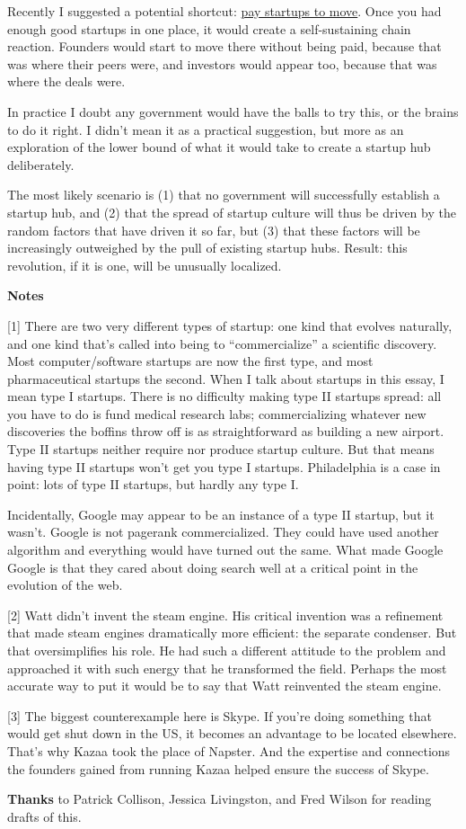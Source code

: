 Recently I suggested a potential shortcut: \href{maybe.html}{pay
startups to move}. Once you had enough good startups in one place, it
would create a self-sustaining chain reaction. Founders would start to
move there without being paid, because that was where their peers were,
and investors would appear too, because that was where the deals were.

In practice I doubt any government would have the balls to try this, or
the brains to do it right. I didn't mean it as a practical suggestion,
but more as an exploration of the lower bound of what it would take to
create a startup hub deliberately.

The most likely scenario is (1) that no government will successfully
establish a startup hub, and (2) that the spread of startup culture will
thus be driven by the random factors that have driven it so far, but (3)
that these factors will be increasingly outweighed by the pull of
existing startup hubs. Result: this revolution, if it is one, will be
unusually localized.

\textbf{Notes}

{[}1{]} There are two very different types of startup: one kind that
evolves naturally, and one kind that's called into being to
``commercialize'' a scientific discovery. Most computer/software
startups are now the first type, and most pharmaceutical startups the
second. When I talk about startups in this essay, I mean type I
startups. There is no difficulty making type II startups spread: all you
have to do is fund medical research labs; commercializing whatever new
discoveries the boffins throw off is as straightforward as building a
new airport. Type II startups neither require nor produce startup
culture. But that means having type II startups won't get you type I
startups. Philadelphia is a case in point: lots of type II startups, but
hardly any type I.

Incidentally, Google may appear to be an instance of a type II startup,
but it wasn't. Google is not pagerank commercialized. They could have
used another algorithm and everything would have turned out the same.
What made Google Google is that they cared about doing search well at a
critical point in the evolution of the web.

{[}2{]} Watt didn't invent the steam engine. His critical invention was
a refinement that made steam engines dramatically more efficient: the
separate condenser. But that oversimplifies his role. He had such a
different attitude to the problem and approached it with such energy
that he transformed the field. Perhaps the most accurate way to put it
would be to say that Watt reinvented the steam engine.

{[}3{]} The biggest counterexample here is Skype. If you're doing
something that would get shut down in the US, it becomes an advantage to
be located elsewhere. That's why Kazaa took the place of Napster. And
the expertise and connections the founders gained from running Kazaa
helped ensure the success of Skype.

\textbf{Thanks} to Patrick Collison, Jessica Livingston, and Fred Wilson
for reading drafts of this.
